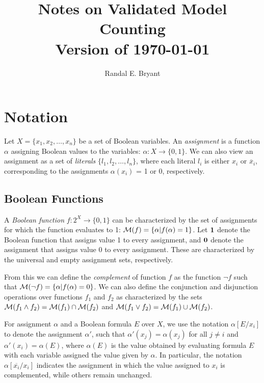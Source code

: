 \documentclass{llncs}
\title{Notes on Validated Model Counting \\ Version of \today}
\author{Randal E. Bryant}
\institute{
Computer Science Department \\
Carnegie Mellon University, Pittsburgh, PA, United States
}
\newcommand{\one}{\mbox{\bf 1}}
\newcommand{\zero}{\mbox{\bf 0}}
\newcommand{\booland}{\land}
\newcommand{\boolor}{\lor}
\newcommand{\boolnot}{\neg}
\newcommand{\tautology}{1}
\newcommand{\nil}{0}
\newcommand{\obar}[1]{\overline{#1}}
\newcommand{\interp}{\alpha}
\newcommand{\interpset}[1]{{\cal M}(#1)}
\newcommand{\subs}[2]{[#2/#1]}
\newcommand{\subsflip}[1]{\subs{#1}{\obar{#1}}}
\begin{document}
\maketitle

\section{Notation}

Let $X = \{x_1, x_2, \ldots, x_n\}$ be a set of Boolean variables.  An
{\em assignment} is a function $\interp$ assigning Boolean values to
the variables: $\interp:X \rightarrow \{\nil, \tautology\}$.  We can
also view an assignment as a set of {\em literals} $\{l_1, l_2,
\ldots, l_n\}$, where each literal $l_i$ is either $x_i$ or
$\obar{x}_i$, corresponding to the assignments $\interp(x_i)$ = 1 or 0,
respectively.

\subsection{Boolean Functions}

A {\em Boolean function} $f:2^X \rightarrow \{0,1\}$ can be
characterized by the set of assignments for which the function
evaluates to 1: $\interpset{f} = \{ \interp | f(\interp) = 1\}$.  Let
$\one$ denote the Boolean function that assigns value 1 to every
assignment, and $\zero$ denote the assignment that assigns value 0 to
every assignment.  These are characterized by the universal and empty
assignment sets, respectively.


From
this we can define the {\em complement} of function $f$ as the function
$\boolnot f$ such that
$\interpset{\boolnot f} = \{ \interp | f(\interp) = 0\}$.
We can also define the conjunction and disjunction operations over functions $f_1$ and $f_2$ as characterized by the sets
$\interpset{f_1 \booland f_2} = \interpset{f_1} \cap \interpset{f_2}$ and
$\interpset{f_1 \boolor f_2} = \interpset{f_1} \cup \interpset{f_2}$.

For assignment $\interp$ and a Boolean formula $E$ over $X$, we
use the notation $\interp\subs{x_i}{E}$ to denote the assignment
$\interp'$, such that $\interp'(x_j) = \interp(x_j)$ for all $j \not = i$
and $\interp'(x_i) = \interp(E)$, where $\interp(E)$ is the value obtained by evaluating formula $E$ with each variable assigned the value given by $\interp$.
In particular, the notation
$\interp\subsflip{x_i}$ indicates the assignment in which the value
assigned to $x_i$ is complemented, while others remain unchanged.
\end{document}
